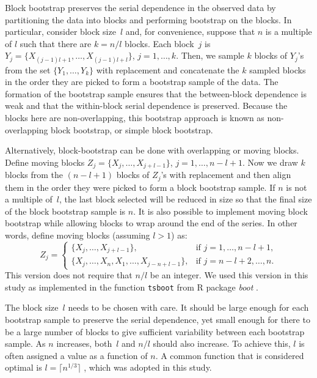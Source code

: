 \documentclass[12pt, letterpaper, titlepage]{article}
\begin{document}
Block bootstrap preserves the serial dependence in the observed data by
partitioning the data into blocks and performing bootstrap on the blocks.
In particular, consider block size~$l$ and, for convenience, suppose that
$n$ is a multiple of $l$ such that there are $k = n / l$ blocks. Each block~$j$
is $Y_j = \{X_{(j - 1) l + 1}, \ldots, X_{(j - 1) l + l}\}$,
$j = 1, \ldots,   k$.  Then, we sample $k$ blocks of $Y_j$'s from the set 
$\{Y_1, \ldots, Y_k\}$ with replacement and concatenate the $k$ sampled blocks
in the order they are picked to form a bootstrap sample of the data. The
formation of the bootstrap sample ensures that the between-block dependence is
weak and that the within-block serial dependence is preserved. Because the
blocks here are non-overlapping, this bootstrap approach is known as
non-overlapping block bootstrap, or simple block bootstrap.

Alternatively, block-bootstrap can be done with overlapping or moving blocks.
Define moving blocks $Z_j = \{X_j, \ldots, X_{j + l - 1}\}$,
$j = 1, \ldots, n - l + 1$. Now we draw $k$ blocks from the $(n - l + 1)$
blocks
of $Z_j$'s with replacement and then align them in the order they were
picked
to form a block bootstrap sample. If $n$ is not a multiple of~$l$, the last
block selected will be reduced in size so that the final size of the
block bootstrap sample is $n$. It is also possible to implement moving block
bootstrap while allowing blocks to wrap around the end of the series. In other
words, define moving blocks (assuming $l > 1$) as:
\begin{equation}
Z_j =
    \begin{cases}
        \{X_j, \ldots, X_{j + l - 1}\}, & \text{if } j = 1, \dots, n - l + 1,\\
        \{X_j, \ldots, X_n, X_1, \ldots, X_{j-n+l-1}\}, & \text{if } j = n - l
        + 2 ,\dots, n.
    \end{cases}
\end{equation}
This version does not require that $n/l$ be an integer.
We used this version in this study as implemented in the function
\texttt{tsboot} from R package \textsl{boot} \citep{boot}.

The block size~$l$ needs to be chosen with care. It should be large enough for
each bootstrap sample to preserve the serial dependence, yet small enough for
there to be a large number of blocks to give sufficient variability between
each bootstrap sample. As $n$ increases, both~$l$
and $n / l$ should also increase. To achieve this, $l$ is
often assigned a value as a function of $n$. A common function that is
considered optimal is $l = \lceil n^{1/3} \rceil$
\citep{buhlmann1999block}, which was adopted in this study.
\end{document}
